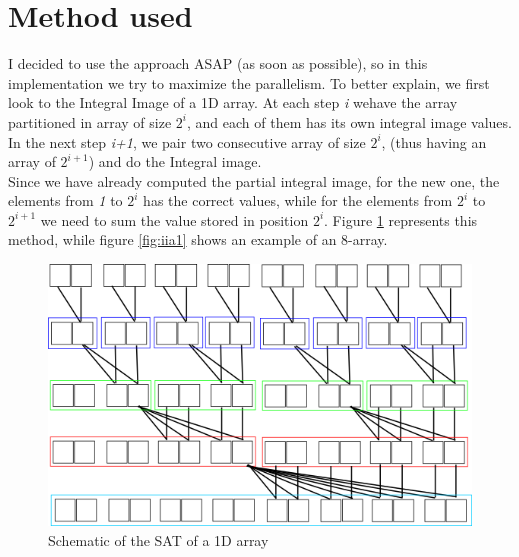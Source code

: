  \section{Method used}
 I decided to use the approach ASAP (as soon as possible), so in this implementation we try to maximize the parallelism.
 To better explain, we first look to the Integral Image of a 1D array.
 At each step \textit{i} wehave the array  partitioned in array of size $ 2^{i} $, and each of them has its own integral image values.\\
 In the next step \textit{i+1}, we pair two consecutive array of size $ 2^{i} $, (thus having an array of $ 2^{i+1} $) and do the Integral image. \\Since we have already computed the partial integral image, for the new one, the elements from \textit{1} to $ 2^{i} $ has the correct values, while for the elements from $ 2^{i} $ to $ 2^{i+1} $ we need to sum the value stored in position $2^{i} $.
 Figure \ref{fig:iia0} represents this method, while figure \ref{fig:iia1} shows an example of an 8-array.
 
   	\begin{figure}[h]
   		\centering
   		\includegraphics[width=\textwidth]{imm/iia/iia00.png}  
   		\caption{Schematic of the SAT of a 1D array}
   		\label{fig:iia0}
   	\end{figure}
   	

